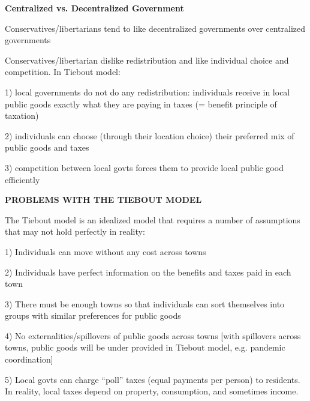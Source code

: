 \documentclass[landscape]{slides}
\begin{document}
\begin{slide}
\begin{center}
{\bf Centralized vs. Decentralized Government}
\end{center}
Conservatives/libertarians tend to like decentralized governments over centralized governments 

Conservatives/libertarian dislike redistribution and like individual choice and competition. In Tiebout model:

1)  local governments do not do any redistribution: individuals receive in
local public goods exactly what they are paying in taxes (= benefit principle of taxation)

2) individuals can choose (through their location choice) their preferred mix of public goods
and taxes

3) competition between local govts forces them to provide local public good efficiently




\end{slide}


\begin{slide}
\begin{center}
{\bf PROBLEMS WITH THE TIEBOUT MODEL}
\end{center}

The Tiebout model is an idealized model that requires a number of assumptions that may not hold perfectly in reality:

1) Individuals can move without any cost across towns

2) Individuals have perfect information on the benefits and taxes paid in each town



3) There must be enough towns so that individuals can sort themselves into groups with similar preferences for public goods

4) No externalities/spillovers of public goods across towns [with spillovers across towns, 
public goods will be under provided in Tiebout model, e.g. pandemic coordination]

5) Local govts can charge ``poll'' taxes (equal payments per person) to residents. In reality, local taxes depend
on property, consumption, and sometimes income.
\end{slide}
\end{document}

